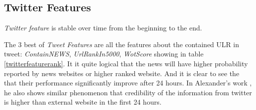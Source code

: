   \begin{table}[!h]
 \centering
{}
\caption{Rank of Part of Text Feature}
\label{testfeaturerank}
\end{table}
\newpage
 \subsection{Twitter Features} 
   \emph{Twitter feature} is stable over time from the beginning to the end.

 The 3 best of \emph{Tweet Features} are all the features about the contained ULR in tweet: \emph{ContainNEWS}, \emph{UrlRankIn5000}, \emph{WotScore} showing in table \ref{twitterfeaturerank}. It it quite logical that the news will have higher probability reported by news websites or higher ranked website. And it is clear to see the that their performance significantly improve after 24 hours. In Alexander's work \cite{mills2009web}, he also shows similar phenomenon that credibility of the information from twitter is higher than external website in the first 24 hours. 
 
